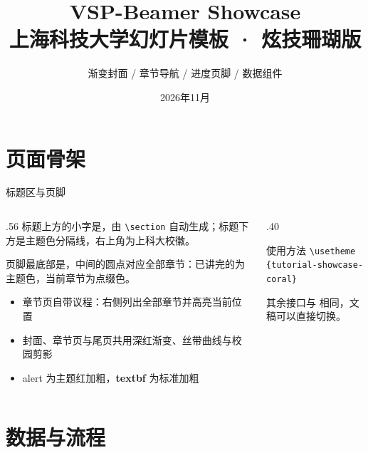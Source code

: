 \documentclass[aspectratio=169,10pt]{beamer}
\title[VSP-Beamer Showcase]{VSP-Beamer Showcase\\上海科技大学幻灯片模板 · 炫技珊瑚版}
\subtitle{渐变封面 / 章节导航 / 进度页脚 / 数据组件}
\date{2026年11月}
\begin{document}
\VSPtitleframe

\section{页面骨架}

\begin{frame}[t]{标题区与页脚}
\begin{columns}[T,onlytextwidth]
  \begin{column}{.56\textwidth}
    标题上方的小字是，由 \texttt{\textbackslash section} 自动生成；标题下方是主题色分隔线，右上角为上科大校徽。

    页脚最底部是，中间的圆点对应全部章节：已讲完的为主题色，当前章节为点缀色。

    \begin{itemize}
      \item 章节页自带议程：右侧列出全部章节并高亮当前位置
      \item 封面、章节页与尾页共用深红渐变、丝带曲线与校园剪影
      \item \alert{alert} 为主题红加粗，\textbf{textbf} 为标准加粗
    \end{itemize}
  \end{column}
  \begin{column}{.40\textwidth}
    \begin{vspquote}{使用方法}
      \texttt{\textbackslash usetheme}\\\texttt{\{tutorial-showcase-coral\}}

      其余接口与  相同，文稿可以直接切换。
    \end{vspquote}
      
  \end{column}
\end{columns}
\end{frame}

\section{数据与流程}
\end{document}
